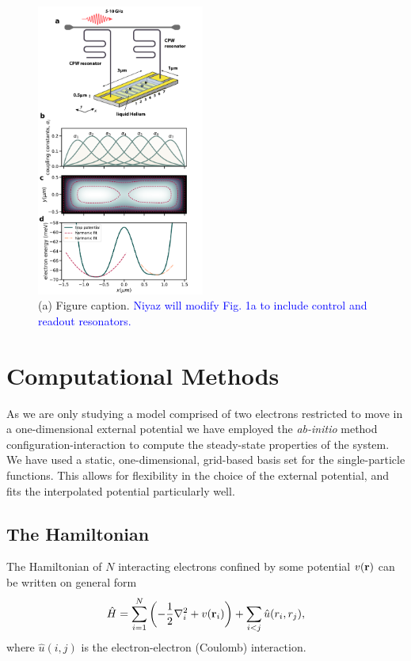 \documentclass[twocolumn,superscriptaddress,unsortedaddress,
 amsmath,amssymb,
 aps,
]{revtex4-2}
\begin{document}
\begin{figure}
\includegraphics[width=0.49\textwidth]{figure1.pdf}
\caption{\label{fig1} (a) Figure caption. \textcolor{blue}{Niyaz will modify Fig. 1a to include control and readout resonators.}}
\end{figure}

\section{Computational Methods} %
    As we are only studying a model comprised of two electrons restricted to move in a
    one-dimensional external potential we have employed the
    \emph{ab-initio} method configuration-interaction to compute the steady-state
    properties of the system.
    We have used a static, one-dimensional, grid-based basis set for the single-particle
    functions.
    This allows for flexibility in the choice of the external potential, and fits the
    interpolated potential particularly well.
    
    \subsection{The Hamiltonian}
    The Hamiltonian of $N$ interacting electrons confined by some potential $v(\vb{r})$ can be written on general form 
    \begin{equation}
        \hat{H} = \sum_{i=1}^N \left(-\frac{1}{2}\nabla_i^2 + v(\vb{r}_i) \right) + \sum_{i < j} \hat{u}(r_i, r_j),
    \end{equation}
    where $\hat{u}(i,j)$ is the electron-electron (Coulomb) interaction. 
    
\end{document}
